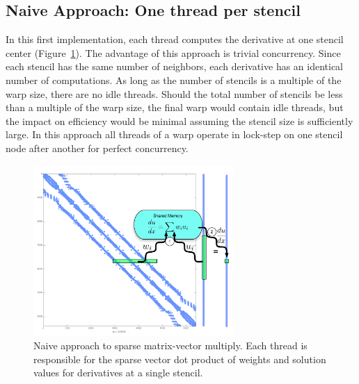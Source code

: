 \documentclass{report}
\begin{document}



\subsection{Naive Approach: One thread per stencil}

In this first implementation, each thread computes 
the derivative at one stencil center  (Figure~\ref{fig:oneThreadPerStencil}). 
The advantage of this approach is trivial concurrency.  Since each stencil has the same number of neighbors, each derivative has an identical number of computations. As long as the number of stencils is a multiple of the warp size, there are no idle threads. Should the total number of stencils be less than a multiple of the warp size, the final warp would contain idle threads, but the impact on efficiency would be minimal assuming the stencil size is sufficiently large. In this approach all threads of a warp operate in lock-step on one stencil node after another for perfect concurrency. %

\begin{figure}[ht]
      \centering
       \includegraphics[width=3in]{../figures/paper1/figures/omnigraffle/oneThreadPerStencil.pdf}
      \caption{Naive approach to sparse matrix-vector multiply. Each thread is responsible for the sparse vector dot product of weights and solution values for derivatives at a single stencil.  }
      \label{fig:oneThreadPerStencil}
\end{figure}
\end{document}
